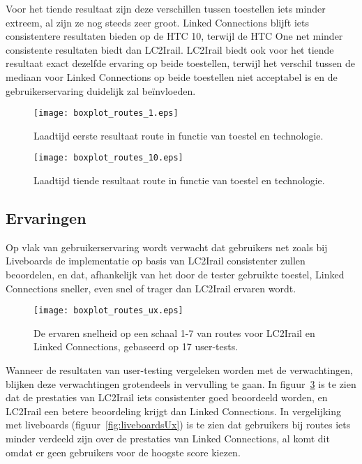 Voor het tiende resultaat zijn deze verschillen tussen toestellen iets minder extreem, al zijn ze nog steeds zeer groot. Linked Connections blijft iets consistentere resultaten bieden op de HTC 10, terwijl de HTC One net minder consistente resultaten biedt dan LC2Irail. LC2Irail biedt ook voor het tiende resultaat exact dezelfde ervaring op beide toestellen, terwijl het verschil tussen de mediaan voor Linked Connections op beide toestellen niet acceptabel is en de gebruikerservaring duidelijk zal beïnvloeden.

\begin{figure}[h]
	\centering
	\texttt{[image: boxplot\_routes\_1.eps]}
	\caption[Laadtijd eerste resultaat route in functie van toestel en technologie]{Laadtijd eerste resultaat route in functie van toestel en technologie.}
	\label{fig:routesBoxplot1}
\end{figure}

\begin{figure}[h]
	\centering
	\texttt{[image: boxplot\_routes\_10.eps]}
	\caption[Laadtijd tiende resultaat route in functie van toestel en technologie]{Laadtijd tiende resultaat route in functie van toestel en technologie.}
	\label{fig:routesBoxplot10}
\end{figure}

\subsection{Ervaringen}

Op vlak van gebruikerservaring wordt verwacht dat gebruikers net zoals bij Liveboards de implementatie op basis van LC2Irail consistenter zullen beoordelen, en dat, afhankelijk van het door de tester gebruikte toestel, Linked Connections sneller, even snel of trager dan LC2Irail ervaren wordt.

\begin{figure}[h]
	\centering
	\texttt{[image: boxplot\_routes\_ux.eps]}
	\caption[Ervaren snelheid van routes]{De ervaren snelheid op een schaal 1-7 van routes voor LC2Irail en Linked Connections, gebaseerd op 17 user-tests.}
	\label{fig:routesUx}
\end{figure}

Wanneer de resultaten van user-testing vergeleken worden met de verwachtingen, blijken deze verwachtingen grotendeels in vervulling te gaan. In figuur~\ref{fig:routesUx} is te zien dat de prestaties van LC2Irail iets consistenter goed beoordeeld worden, en LC2Irail een betere beoordeling krijgt dan Linked Connections. In vergelijking met liveboards (figuur~\ref{fig:liveboardsUx}) is te zien dat gebruikers bij routes iets minder verdeeld zijn over de prestaties van Linked Connections, al komt dit omdat er geen gebruikers voor de hoogste score kiezen. 

